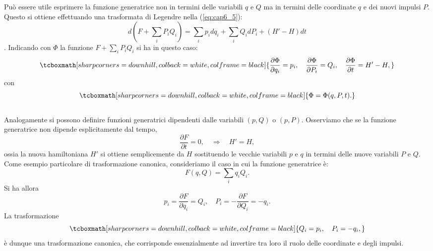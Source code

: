 \documentclass[a4paper,12pt,oneside]{book}
\begin{document}
Pu\`o essere utile esprimere la funzione generatrice non in termini delle variabili $q$ e $Q$ ma in termini delle coordinate $q$ e dei nuovi impulsi $P$. Questo si ottiene effettuando una trasformata di Legendre nella (\ref{eq:cap6_5}):
	\begin{equation}
		d(F+\sum_i P_iQ_i) = \sum_i p_i dq_i + \sum_i Q_i dP_i + (H'-H)dt
	\end{equation}.
Indicando con $\Phi$ la funzione $F+\sum_iP_i Q_i $ si ha in questo caso:
	\begin{equation}
		\tcboxmath[sharp corners=downhill, colback=white, colframe=black]{
			\frac{\partial \Phi}{\partial q_i} = p_i , \quad \frac{\partial \Phi}{\partial P_i} = Q_i , \quad \frac{\partial \Phi}{\partial t} = H'- H ,
			}
		\label{eq:cap6_6}
	\end{equation}
con
	\begin{equation}
		\tcboxmath[sharp corners=downhill, colback=white, colframe=black]{
			\Phi = \Phi (q,P,t) .
			}
	\end{equation}\\
	
Analogamente si possono definire funzioni generatrici dipendenti dalle variabili $(p,Q)$ o $(p,P)$. Osserviamo che se la funzione generatrice non dipende esplicitamente dal tempo,
	\begin{equation}
		\frac{\partial F}{\partial t} = 0 , \quad \Rightarrow \quad H' = H ,
	\end{equation}
ossia la nuova hamiltoniana $H'$ si ottiene semplicemente da $H$ sostituendo le vecchie variabili $p$ e $q$ in termini delle nuove variabili $P$ e $Q$.\\

Come esempio particolare di trasformazione canonica, consideriamo il caso in cui la funzione generatrice \`e:
	\begin{equation}
		F(q,Q) = \sum_i q_i Q_i .
	\end{equation}
Si ha allora
	\begin{equation}
		p_i = \frac{\partial F}{\partial q_i} = Q_i , \quad P_i = - \frac{\partial F}{\partial Q_i} = -q_i .
	\end{equation}
La trasformazione
	\begin{equation}
		\tcboxmath[sharp corners=downhill, colback=white, colframe=black]{
			Q_i = p_i  , \quad P_i = -q_i ,
			}
	\end{equation}
\`e dunque una trasformazione canonica, che corrisponde essenzialmente ad invertire tra loro il ruolo delle coordinate e degli impulsi.
\end{document}
